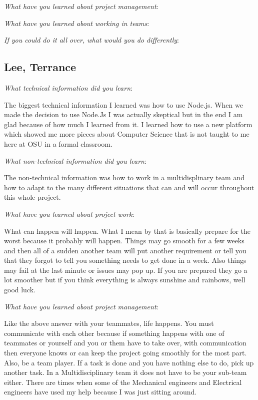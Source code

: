\documentclass[10pt,draftclsnofoot,onecolumn]{IEEEtran}
\newcommand{\subsubsubsection}[1]{
	\hfill\break\textit{#1}:
}
\begin{document}
\subsubsubsection{What have you learned about project management}

\subsubsubsection{What have you learned about working in teams}

\subsubsubsection{If you could do it all over, what would you do differently}


\subsection{Lee, Terrance}

\subsubsubsection{What technical information did you learn}
The biggest technical information I learned was how to use Node.js.  When we made the decision to use Node.Js I was actually skeptical but in the end I am glad because of how much I learned from it.  I learned how to use a new platform which showed me more pieces about Computer Science that is not taught to me here at OSU in a formal classroom.  

\subsubsubsection{What non-technical information did you learn}
The non-technical information was how to work in a multidisplinary team and how to adapt to the many different situations that can and will occur throughout this whole project.  

\subsubsubsection{What have you learned about project work}
What can happen will happen.  What I mean by that is basically prepare for the worst because it probably will happen.  Things may go smooth for a few weeks and then all of a sudden another team will put another requirement or tell you that they forgot to tell you something needs to get done in a week. Also things may fail at the last minute or issues may pop up.  If you are prepared they go a lot smoother but if you think everything is always sunshine and rainbows, well good luck.  

\subsubsubsection{What have you learned about project management}
Like the above answer with your teammates, life happens.  You must communicate with each other because if something happens with one of teammates or yourself and you or them have to take over, with communication then everyone knows or can keep the project going smoothly for the most part.  Also, be a team player.  If a task is done and you have nothing else to do, pick up another task.  In a Multidisciplinary team it does not have to be your sub-team either.  There are times when some of the Mechanical engineers and Electrical engineers have used my help because I was just sitting around.   
\end{document}
